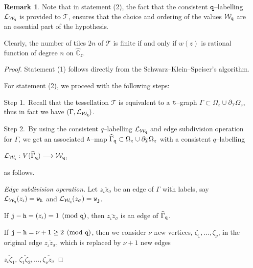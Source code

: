 \documentclass[final,3p,times]{elsarticle}
\newcommand{\CW}{\ensuremath{{\widehat{\mathbb C}}}}
\theoremstyle{definition}
\newtheorem{remark}[theorem]{Remark}
\begin{document}
\begin{remark}
Note that in statement (2), the fact that the consistent $\tt q$--labelling 
$\mathcal{L}_{\mathcal{W}_{\tt q}}$ is provided to $\mathscr{T}$, 
ensures that the choice and ordering of the values $\mathcal{W}_{\tt q}$ 
are an essential part of the hypothesis.

\noindent 
Clearly, the number of tiles $2n$ of $\mathscr{T}$ is finite 
if and only if $w(z)$ is rational function of degree $n$ on $\CW_z$.
\end{remark}


\begin{proof}
Statement (1) follows directly from the Schwarz--Klein--Speiser's algorithm.

\medskip
For statement (2), we proceed with the following steps:

\noindent
Step 1.\ Recall that the tessellation $\mathscr{T}$ is equivalent to a $\tt t$--graph 
$\Gamma \subset \Omega_z \cup \partial_{\mathcal{I}} \Omega_z$, thus in fact we have $(\Gamma,\mathcal{L}_{\mathcal{W}_{\tt q}})$.

\smallskip
\noindent 
Step 2.\ By using the consistent $q$--labelling 
$\mathcal{L}_{\mathcal{W}_{\tt q}}$ and edge subdivision operation 
for $\Gamma$, we get an associated ${\tt A}$--map 
$\widehat{\Gamma}_{\tt q} \subset \Omega_z \cup \partial_{\mathcal{I}} \Omega_z$ with a 
consistent $q$--labelling 

\centerline{
$\mathcal{L}_{\mathcal{W}_{\tt q}}: V(\widehat{\Gamma}_{\tt q}) \longrightarrow \mathcal{W}_{\tt q}$,}

\noindent 
as follows.

\noindent
{\it Edge subdivision operation.}
Let $\overline{z_\iota z_\sigma}$ be an edge of $\Gamma$ with 
labels, say 
$\mathcal{L}_{\mathcal{W}_{\tt q}}(z_\iota)={\tt w}_{\tt h}$ and 
$\mathcal{L}_{\mathcal{W}_{\tt q}}(z_\sigma)={\tt w}_{\tt j}$. 

\noindent 
If $ {\tt j} - {\tt h} =(z_\iota) = 
1  \pmod{\tt q} $, 
then $\overline{z_\iota z_\sigma}$ is an edge of 
$\widehat{\Gamma}_{\tt q}$.

\noindent 
If $ {\tt j} - {\tt h} =
\nu +1 \geq 2  \pmod{\tt q} $, 
then we consider $\nu$ new vertices,
$\zeta_1, \ldots, \zeta_\nu$,
in the original edge 
$\overline{z_\iota z_\sigma}$, 
which is replaced by $\nu +1$ new edges 

\centerline{$ 
\overline{z_\iota \zeta_1}, \,
\overline{\zeta_1 \zeta_2}, \ldots ,
\overline{\zeta_\nu z_\sigma}
$}


\end{proof}
\end{document}

